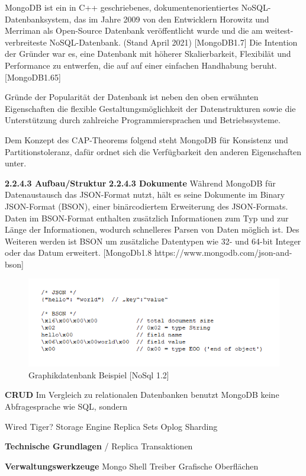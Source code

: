 MongoDB ist ein in C++ geschriebenes, dokumentenorientiertes NoSQL-Datenbanksystem, das im Jahre 2009 von den Entwicklern Horowitz und Merriman als Open-Source Datenbank veröffentlicht wurde und die am weitest-verbreiteste NoSQL-Datenbank. (Stand April 2021) [MongoDB1.7] Die Intention der Gründer war es, eine Datenbank mit höherer Skalierbarkeit, Flexibilät und Performance zu entwerfen, die auf auf einer einfachen Handhabung beruht. [MongoDB1.65]
\newline

Gründe der Popularität der Datenbank ist neben den oben erwähnten Eigenschaften die flexible Gestaltungsmöglichkeit der Datenstrukturen sowie die Unterstützung durch zahlreiche Programmiersprachen und Betriebssysteme.
\newline

Dem Konzept des CAP-Theorems folgend steht MongoDB für Konsistenz und Partitionstoleranz, dafür ordnet sich die Verfügbarkeit den anderen Eigenschaften unter.
\newline

\textbf{2.2.4.3 Aufbau/Struktur}
\newline
\textbf{2.2.4.3 Dokumente}
\newline
Während MongoDB für Datenaustausch das JSON-Format nutzt, hält es seine Dokumente im Binary JSON-Format (BSON), einer binärcodiertem Erweiterung des JSON-Formats. Daten im BSON-Format enthalten zusätzlich Informationen zum Typ und zur Länge der Informationen, wodurch schnelleres Parsen von Daten möglich ist. Des Weiteren werden ist BSON um zusätzliche Datentypen wie 32- und 64-bit Integer oder das Datum erweitert. [MongoDb1.8 https://www.mongodb.com/json-and-bson] 
\newline

\begin{figure}[h]
\centering
\includegraphics[]{images/BSON.PNG}
\caption{Graphikdatenbank Beispiel [NoSql 1.2]}
\end{figure}



\textbf{CRUD}
\newline
Im Vergleich zu relationalen Datenbanken benutzt MongoDB keine Abfragesprache wie SQL, sondern 


Wired Tiger?
Storage Engine
Replica Sets
Oplog
Sharding
\newline

\textbf{Technische Grundlagen}
/
Replica
Transaktionen
\newline

\textbf{Verwaltungswerkzeuge}
Mongo Shell
Treiber
Grafische Oberflächen
